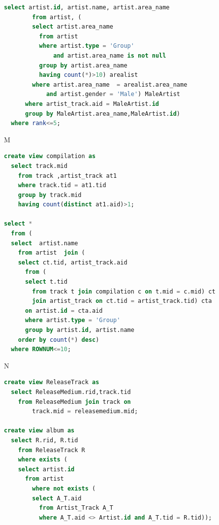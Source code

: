 \documentclass[11pt]{article} %
\begin{document}
{\begin{lstlisting}[language=SQL, keywordstyle=\color{blue!70},
commentstyle=\color{red!50!green!50!blue!50},
rulesepcolor=\color{red!20!green!20!blue!20},
frame=shadowbox]
      select artist.id, artist.name, artist.area_name
        from artist, (
        select artist.area_name
          from artist
          where artist.type = 'Group'
              and artist.area_name is not null
          group by artist.area_name
          having count(*)>10) arealist
        where artist.area_name  = arealist.area_name
            and artist.gender = 'Male') MaleArtist
      where artist_track.aid = MaleArtist.id 
      group by MaleArtist.area_name,MaleArtist.id)
  where rank<=5;
\end{lstlisting}
M
\begin{lstlisting}[language=SQL, keywordstyle=\color{blue!70},
commentstyle=\color{red!50!green!50!blue!50},
rulesepcolor=\color{red!20!green!20!blue!20},
frame=shadowbox]
create view compilation as
  select track.mid
    from track ,artist_track at1
    where track.tid = at1.tid
    group by track.mid
    having count(distinct at1.aid)>1;

select *
  from (
  select  artist.name
    from artist  join (
    select ct.tid, artist_track.aid
      from (
      select t.tid
        from track t join compilation c on t.mid = c.mid) ct
        join artist_track on ct.tid = artist_track.tid) cta
      on artist.id = cta.aid 
      where artist.type = 'Group'
      group by artist.id, artist.name
    order by count(*) desc)
  where ROWNUM<=10;
\end{lstlisting}
N
\begin{lstlisting}[language=SQL, keywordstyle=\color{blue!70},
commentstyle=\color{red!50!green!50!blue!50},
rulesepcolor=\color{red!20!green!20!blue!20},
frame=shadowbox]
create view ReleaseTrack as
  select ReleaseMedium.rid,track.tid
    from ReleaseMedium join track on
        track.mid = releasemedium.mid;

create view album as
  select R.rid, R.tid
    from ReleaseTrack R
    where exists (
    select artist.id
      from artist
        where not exists (
        select A_T.aid
          from Artist_Track A_T
          where A_T.aid <> Artist.id and A_T.tid = R.tid));
              

\end{lstlisting}}
\end{document}
